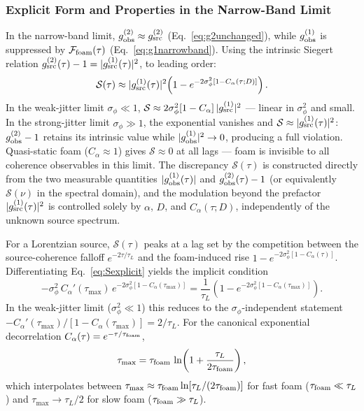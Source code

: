 \documentclass[aps,prd,onecolumn,amsmath,amssymb]{revtex4-2}
\begin{document}
\subsubsection{Explicit Form and Properties in the Narrow-Band Limit}

In the narrow-band limit, $g^{(2)}_{\rm obs} \approx g^{(2)}_{\rm src}$
(Eq.~\eqref{eq:g2unchanged}), while $g^{(1)}_{\rm obs}$ is suppressed by
$\mathcal{F}_{\rm foam}(\tau)$ (Eq.~\eqref{eq:g1narrowband}).
Using the intrinsic Siegert relation $g^{(2)}_{\rm src}(\tau)-1=|g^{(1)}_{\rm src}(\tau)|^2$,
to leading order:
\begin{equation}
  \mathcal{S}(\tau) \approx
  |g^{(1)}_{\rm src}(\tau)|^2\!\left(1-e^{-2\sigma_\phi^2[1-C_\alpha(\tau;D)]}\right).
  \label{eq:Sexplicit}
\end{equation}
In the weak-jitter limit $\sigma_\phi\ll 1$,
$\mathcal{S}\approx 2\sigma_\phi^2[1-C_\alpha]\,|g^{(1)}_{\rm src}|^2$ — linear
in $\sigma_\phi^2$ and small.
In the strong-jitter limit $\sigma_\phi\gg 1$, the exponential vanishes and
$\mathcal{S}\approx|g^{(1)}_{\rm src}(\tau)|^2$: $g^{(2)}_{\rm obs}-1$ retains
its intrinsic value while $|g^{(1)}_{\rm obs}|^2\to 0$, producing a full violation.
Quasi-static foam ($C_\alpha\approx 1$) gives $\mathcal{S}\approx 0$ at all lags
— foam is invisible to all coherence observables in this limit.
The discrepancy $\mathcal{S}(\tau)$ is constructed directly from
the two measurable quantities $|g^{(1)}_{\rm obs}(\tau)|$ and
$g^{(2)}_{\rm obs}(\tau)-1$ (or equivalently $\mathcal{S}(\nu)$
in the spectral domain), and the modulation beyond the prefactor $|g^{(1)}_{\rm src}(\tau)|^2$
is controlled solely by $\alpha$, $D$, and $C_\alpha(\tau;D)$, independently
of the unknown source spectrum.

For a Lorentzian source, $\mathcal{S}(\tau)$ peaks at a lag set by the
competition between the source-coherence falloff $e^{-2\tau/\tau_L}$ and
the foam-induced rise $1-e^{-2\sigma_\phi^2[1-C_\alpha(\tau)]}$.
Differentiating Eq.~\eqref{eq:Sexplicit} yields the implicit condition
\begin{equation}
  -\sigma_\phi^2\,C_\alpha'(\tau_{\max})\,e^{-2\sigma_\phi^2[1-C_\alpha(\tau_{\max})]}
  = \frac{1}{\tau_L}\left(1-e^{-2\sigma_\phi^2[1-C_\alpha(\tau_{\max})]}\right).
  \label{eq:taumax_general}
\end{equation}
In the weak-jitter limit ($\sigma_\phi^2\ll 1$) this reduces to the
$\sigma_\phi$-independent statement $-C_\alpha'(\tau_{\max})/[1-C_\alpha(\tau_{\max})]=2/\tau_L$.
For the canonical exponential decorrelation $C_\alpha(\tau)=e^{-\tau/\tau_{\rm foam}}$,
\begin{equation}
  \tau_{\max} = \tau_{\rm foam}\,\ln\!\left(1+\frac{\tau_L}{2\tau_{\rm foam}}\right),
  \label{eq:taumax_exp}
\end{equation}
which interpolates between $\tau_{\max}\approx \tau_{\rm foam}\ln[\tau_L/(2\tau_{\rm foam})]$
for fast foam ($\tau_{\rm foam}\ll\tau_L$) and $\tau_{\max}\to\tau_L/2$ for slow
foam ($\tau_{\rm foam}\gg\tau_L$).
\end{document}
